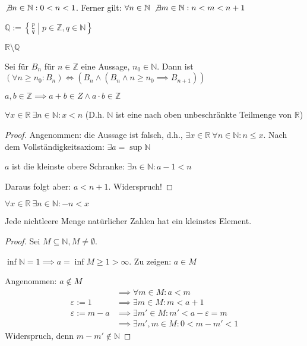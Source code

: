 \begin{corollary}
  $\not\exists n \in \mathbb{N}: 0 < n < 1$. Ferner gilt: $\forall n \in \mathbb{N}\: \not\exists m \in \mathbb{N}: n < m < n+1$
\end{corollary}

\begin{definition}
  $\mathbb{Q} := \left\{ \frac{p}{q} \middle| p \in \mathbb{Z}, q \in \mathbb{N} \right\}$
\end{definition}
\begin{definition}
  $\mathbb{R} \setminus \mathbb{Q}$
\end{definition}
\begin{remark}
  Sei für $B_n$ für $n \in \mathbb{Z}$ eine Aussage, $n_0 \in \mathbb{N}$. Dann ist $(\forall n \ge n_0: B_n) \iff (B_n \wedge (B_n \wedge n \ge n_0 \implies B_{n+1}))$
\end{remark}
\begin{theorem}
  $a, b \in \mathbb{Z} \implies a + b \in Z \wedge a \cdot b \in \mathbb{Z}$
\end{theorem}

\begin{theorem}
  $\forall x \in \mathbb{R}\: \exists n \in \mathbb{N}: x < n$ (D.h. $\mathbb{N}$ ist eine nach oben unbeschränkte Teilmenge von $\mathbb{R}$)
\end{theorem}
\begin{proof}
  Angenommen: die Aussage ist falsch, d.h., $\exists x \in \mathbb{R}\: \forall n \in \mathbb{N}: n \le x$.
  Nach dem Vollständigkeitsaxiom: $\exists a = \operatorname{sup} \mathbb{N}$

  $a$ ist die kleinste obere Schranke: $\exists n \in \mathbb{N}: a-1 < n$

  Daraus folgt aber: $a < n + 1$. Widerspruch!
\end{proof}

\begin{corollary}
  $\forall x \in \mathbb{R}\: \exists n \in \mathbb{N}: -n < x$
\end{corollary}

\begin{theorem}
  Jede nichtleere Menge natürlicher Zahlen hat ein kleinstes Element.
\end{theorem}
\begin{proof}
  Sei $M \subseteq \mathbb{N}, M \ne \emptyset$.

  $\operatorname{inf} \mathbb{N} = 1 \implies a = \operatorname{inf} M \ge 1 > \infty$. Zu zeigen: $a \in M$

  Angenommen: $a \not\in M$
  \begin{align*}
    \,&\implies \forall m \in M: a < m \\
    \varepsilon := 1 &\implies \exists m \in M: m < a+1 \\
    \varepsilon := m - a &\implies \exists m' \in M: m' < a - \varepsilon = m \\
    \,&\implies \exists m', m \in M: 0 < m - m' < 1
  \end{align*}
  Widerspruch, denn $m - m' \not\in \mathbb{N}$
\end{proof}